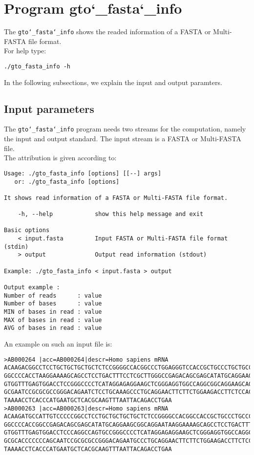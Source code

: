 \section{Program gto\char`_fasta\char`_info}
The \texttt{gto\char`_fasta\char`_info} shows the readed information of a FASTA or Multi-FASTA file format.\\
For help type:
\begin{lstlisting}
./gto_fasta_info -h
\end{lstlisting}
In the following subsections, we explain the input and output paramters.

\subsection*{Input parameters}

The \texttt{gto\char`_fasta\char`_info} program needs two streams for the computation,
namely the input and output standard. The input stream is a FASTA or Multi-FASTA file.\\
The attribution is given according to:
\begin{lstlisting}
Usage: ./gto_fasta_info [options] [[--] args]
   or: ./gto_fasta_info [options]

It shows read information of a FASTA or Multi-FASTA file format.

    -h, --help            show this help message and exit

Basic options
    < input.fasta         Input FASTA or Multi-FASTA file format (stdin)
    > output              Output read information (stdout)

Example: ./gto_fasta_info < input.fasta > output

Output example :
Number of reads      : value
Number of bases      : value
MIN of bases in read : value
MAX of bases in read : value
AVG of bases in read : value
\end{lstlisting}
An example on such an input file is:
\begin{lstlisting}
>AB000264 |acc=AB000264|descr=Homo sapiens mRNA 
ACAAGACGGCCTCCTGCTGCTGCTGCTCTCCGGGGCCACGGCCCTGGAGGGTCCACCGCTGCCCTGCTGCCATTGTCCCC
GGCCCCACCTAAGGAAAAGCAGCCTCCTGACTTTCCTCGCTTGGGCCGAGACAGCGAGCATATGCAGGAAGCGGCAGGAA
GTGGTTTGAGTGGACCTCCGGGCCCCTCATAGGAGAGGAAGCTCGGGAGGTGGCCAGGCGGCAGGAAGCAGGCCAGTGCC
GCGAATCCGCGCGCCGGGACAGAATCTCCTGCAAAGCCCTGCAGGAACTTCTTCTGGAAGACCTTCTCCACCCCCCCAGC
TAAAACCTCACCCATGAATGCTCACGCAAGTTTAATTACAGACCTGAA
>AB000263 |acc=AB000263|descr=Homo sapiens mRNA 
ACAAGATGCCATTGTCCCCCGGCCTCCTGCTGCTGCTGCTCTCCGGGGCCACGGCCACCGCTGCCCTGCCCCTGGAGGGT
GGCCCCACCGGCCGAGACAGCGAGCATATGCAGGAAGCGGCAGGAATAAGGAAAAGCAGCCTCCTGACTTTCCTCGCTTG
GTGGTTTGAGTGGACCTCCCAGGCCAGTGCCGGGCCCCTCATAGGAGAGGAAGCTCGGGAGGTGGCCAGGCGGCAGGAAG
GCGCACCCCCCCAGCAATCCGCGCGCCGGGACAGAATGCCCTGCAGGAACTTCTTCTGGAAGACCTTCTCCTCCTGCAAA
TAAAACCTCACCCATGAATGCTCACGCAAGTTTAATTACAGACCTGAA
\end{lstlisting}


